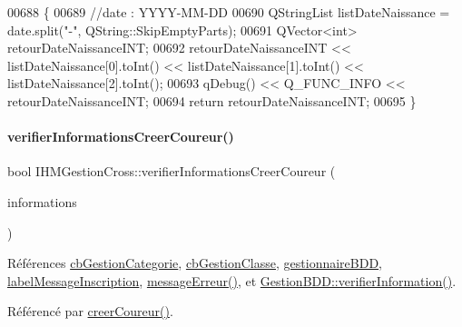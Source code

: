 \begin{DoxyCode}
00688 \{
00689     \textcolor{comment}{//date : YYYY-MM-DD}
00690     QStringList listDateNaissance = date.split(\textcolor{stringliteral}{"-"}, QString::SkipEmptyParts);
00691     QVector<int> retourDateNaissanceINT;
00692     retourDateNaissanceINT << listDateNaissance[0].toInt() << listDateNaissance[1].toInt() << 
      listDateNaissance[2].toInt();
00693     qDebug() << Q\_FUNC\_INFO << retourDateNaissanceINT;
00694     \textcolor{keywordflow}{return} retourDateNaissanceINT;
00695 \}
\end{DoxyCode}
\mbox{\label{class_i_h_m_gestion_cross_ae08eec25f5a6d33bf133b0cee78c7c5c}} 
\paragraph{\texorpdfstring{verifier\+Informations\+Creer\+Coureur()}{verifierInformationsCreerCoureur()}}
{\footnotesize\ttfamily bool I\+H\+M\+Gestion\+Cross\+::verifier\+Informations\+Creer\+Coureur (\begin{DoxyParamCaption}\item[{Q\+String\+List}]{informations }\end{DoxyParamCaption})\hspace{0.3cm}{\ttfamily [private]}}



Références \hyperlink{class_i_h_m_gestion_cross_a60cdc44c61bcd4e1e189c8de5556b89e}{cb\+Gestion\+Categorie}, \hyperlink{class_i_h_m_gestion_cross_af734c4b13942dd83fbbd0355e3728c9f}{cb\+Gestion\+Classe}, \hyperlink{class_i_h_m_gestion_cross_a440bac63a3e51db3e2c08e883f8cafc9}{gestionnaire\+B\+DD}, \hyperlink{class_i_h_m_gestion_cross_a1855bd63290c39c20660064b41710e8c}{label\+Message\+Inscription}, \hyperlink{class_i_h_m_gestion_cross_a92fa6016b00d2d4429c901e77d37bf10}{message\+Erreur()}, et \hyperlink{class_gestion_b_d_d_abfd3cfb9553a83aafd86c3149869d6c0}{Gestion\+B\+D\+D\+::verifier\+Information()}.



Référencé par \hyperlink{class_i_h_m_gestion_cross_a6000b152ba3febb45d6c409519168ba2}{creer\+Coureur()}.


